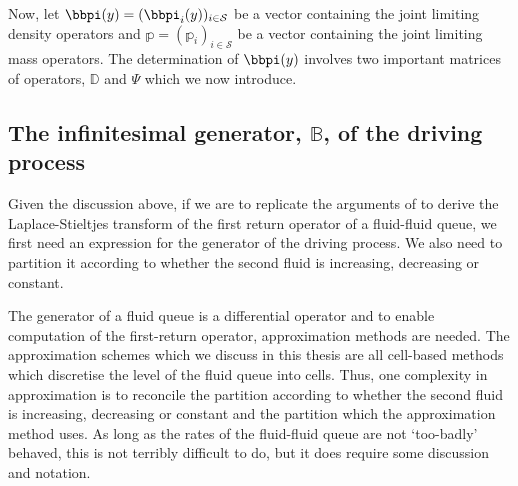 Now, let ${{\bbpi}}(y) = ( \bbpi_i(y))_{i \in \mathcal{S}}$ be a vector containing the joint limiting density operators and ${\mathbb{p}} = ( {\mathbb p}_i)_{i \in \mathcal{S}}$ be a vector containing the joint limiting mass operators. The determination of ${{\bbpi}}(y)$ involves two important matrices of operators, $ {\mathbb D}$ and $ {\mathbb \Psi}$ which we now introduce. %

\subsection{The infinitesimal generator, \(\mathbb B\), of the driving process}
Given the discussion above, if we are to replicate the arguments of \cite{bean2005} to derive the Laplace-Stieltjes transform of the first return operator of a fluid-fluid queue, we first need an expression for the generator of the driving process. We also need to partition it according to whether the second fluid is increasing, decreasing or constant. 

The generator of a fluid queue is a differential operator and to enable computation of the first-return operator, approximation methods are needed. The approximation schemes which we discuss in this thesis are all cell-based methods which discretise the level of the fluid queue into cells. Thus, one complexity in approximation is to reconcile the partition according to whether the second fluid is increasing, decreasing or constant and the partition which the approximation method uses. As long as the rates of the fluid-fluid queue are not `too-badly' behaved, this is not terribly difficult to do, but it does require some discussion and notation. 

\label{subsec:B_operators}
